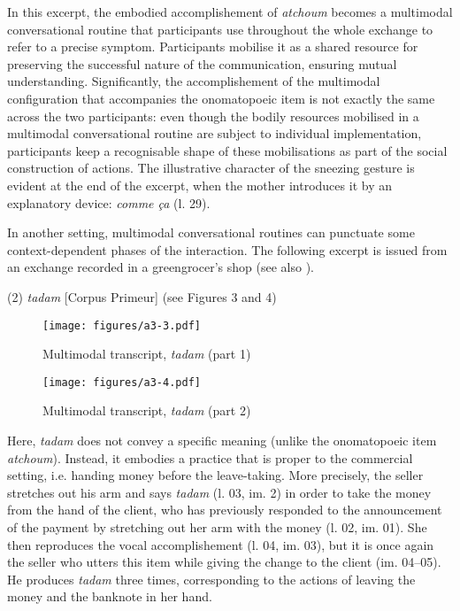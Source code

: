 \documentclass[output=paper]{langscibook}
\begin{document}
In this excerpt, the embodied accomplishement of \textit{atchoum} becomes a multimodal conversational routine that participants use throughout the whole exchange to refer to a precise symptom. Participants mobilise it as a shared resource for preserving the successful nature of the communication, ensuring mutual understanding. Significantly, the accomplishement of the multimodal configuration that accompanies the onomatopoeic item is not exactly the same across the two participants: even though the bodily resources mobilised in a multimodal conversational routine are subject to individual implementation, participants keep a recognisable shape of these mobilisations as part of the social construction of actions. The illustrative character of the sneezing gesture is evident at the end of the excerpt, when the mother introduces it by an explanatory device: \textit{comme ça} (l. 29).

In another setting, multimodal conversational routines can punctuate some context-dependent phases of the interaction. The following excerpt is issued from an exchange recorded in a greengrocer’s shop (see also \citealt{Traverso2016}).

\ea\label{ex:12:2} (2) \textit{tadam} [Corpus Primeur] (see Figures 3 and 4)\z


\begin{figure}[p]
\texttt{[image: figures/a3-3.pdf]}
\caption{Multimodal transcript, \textit{tadam} (part 1)\label{fig:12:2}}
\end{figure}

 
\begin{figure}
\texttt{[image: figures/a3-4.pdf]}
\caption{Multimodal transcript, \textit{tadam} (part 2)\label{fig:12:3}}
\end{figure}

Here, \textit{tadam} does not convey a specific meaning (unlike the onomatopoeic item \textit{atchoum}). Instead, it embodies a practice that is proper to the commercial setting, i.e. handing money before the leave-taking. More precisely, the seller stretches out his arm and says \textit{tadam} (l. 03, im. 2) in order to take the money from the hand of the client, who has previously responded to the announcement of the payment by stretching out her arm with the money (l. 02, im. 01). She then reproduces the vocal accomplishement (l. 04, im. 03), but it is once again the seller who utters this item while giving the change to the client (im. 04--05). He produces \textit{tadam} three times, corresponding to the actions of leaving the money and the banknote in her hand.
\end{document}

